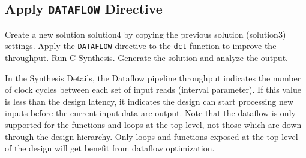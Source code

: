 \documentclass[a4paper,12pt,twoside]{article}
\begin{document}
\subsection{Apply \texttt{DATAFLOW} Directive}\label{S36}
Create a new solution solution4 by copying the previous solution (solution3) settings. Apply the \texttt{DATAFLOW} directive to the \texttt{dct} function to improve the throughput. Run C Synthesis. Generate the solution and analyze the output.

In the Synthesis Details, the Dataflow pipeline throughput indicates the number of clock cycles between each set of input reads (interval parameter). If this value is less than the design latency, it indicates the design can start processing new inputs before the current input data are output. Note that the dataflow is only supported for the functions and loops at the top level, not those
which are down through the design hierarchy. Only loops and functions exposed at the top level of the design will get benefit from dataflow optimization.
\end{document}
